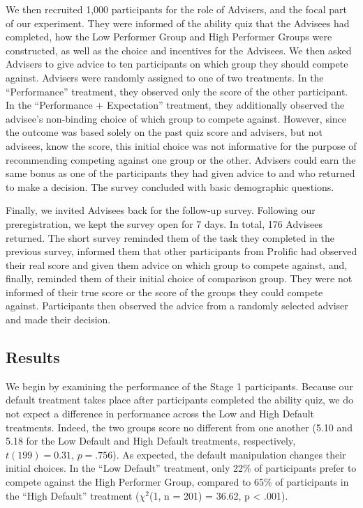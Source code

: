 \documentclass[
  man,
  floatsintext,
  longtable,
  nolmodern,
  notxfonts,
  notimes,
  colorlinks=true,linkcolor=blue,citecolor=blue,urlcolor=blue]{apa7}
\begin{document}
We then recruited 1,000 participants for the role of Advisers, and the
focal part of our experiment. They were informed of the ability quiz
that the Advisees had completed, how the Low Performer Group and High
Performer Groups were constructed, as well as the choice and incentives
for the Advisees. We then asked Advisers to give advice to ten
participants on which group they should compete against. Advisers were
randomly assigned to one of two treatments. In the ``Performance''
treatment, they observed only the score of the other participant. In the
``Performance + Expectation'' treatment, they additionally observed the
advisee's non-binding choice of which group to compete against. However,
since the outcome was based solely on the past quiz score and advisers,
but not advisees, know the score, this initial choice was not
informative for the purpose of recommending competing against one group
or the other. Advisers could earn the same bonus as one of the
participants they had given advice to and who returned to make a
decision. The survey concluded with basic demographic questions.

Finally, we invited Advisees back for the follow-up survey. Following
our preregistration, we kept the survey open for 7 days. In total, 176
Advisees returned. The short survey reminded them of the task they
completed in the previous survey, informed them that other participants
from Prolific had observed their real score and given them advice on
which group to compete against, and, finally, reminded them of their
initial choice of comparison group. They were not informed of their true
score or the score of the groups they could compete against.
Participants then observed the advice from a randomly selected adviser
and made their decision.

\subsection{Results}\label{results}

We begin by examining the performance of the Stage 1 participants.
Because our default treatment takes place after participants completed
the ability quiz, we do not expect a difference in performance across
the Low and High Default treatments. Indeed, the two groups score no
different from one another (5.10 and 5.18 for the Low Default and High
Default treatments, respectively, \(t(199) = 0.31\), \(p = .756\)). As
expected, the default manipulation changes their initial choices. In the
``Low Default'' treatment, only 22\% of participants prefer to compete
against the High Performer Group, compared to 65\% of participants in
the ``High Default'' treatment (\(\chi^2\)(1, n = 201) = 36.62, p
\textless{} .001).
\end{document}
